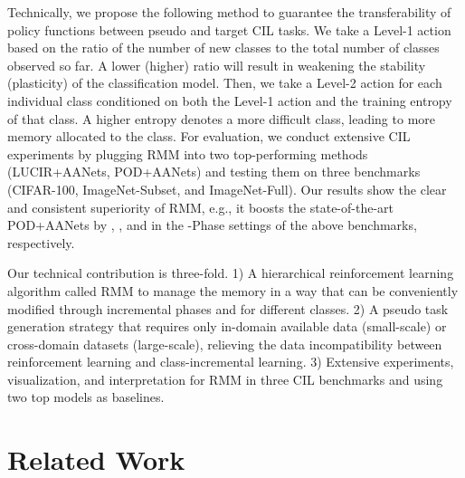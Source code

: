 \documentclass{article}
\begin{document}
Technically, we propose the following method to guarantee the transferability of policy functions between pseudo and target CIL tasks. We take a Level-1 action based on the ratio of the number of new classes to the total number of classes observed so far. A lower (higher) ratio will result in weakening the stability (plasticity) of the classification model. Then, we take a Level-2 action for each individual class conditioned on both the Level-1 action and the training entropy of that class. A higher entropy denotes a more difficult class, leading to more memory allocated to the class. For evaluation, we conduct extensive CIL experiments by plugging RMM into two top-performing methods (LUCIR+AANets, POD+AANets) and testing them on three benchmarks (CIFAR-100, ImageNet-Subset, and ImageNet-Full). Our results show the clear and consistent superiority of RMM, e.g., it boosts the state-of-the-art POD+AANets by , , and  in the -Phase settings of the above benchmarks, respectively.

Our technical contribution is three-fold. 1) A hierarchical reinforcement learning algorithm called RMM to manage the memory in a way that can be conveniently modified through incremental phases and for different classes. 2) A pseudo task generation strategy that requires only in-domain available data (small-scale) or cross-domain datasets (large-scale), relieving the data incompatibility between reinforcement learning and class-incremental learning. 
3) Extensive experiments, visualization, and interpretation for RMM in three CIL benchmarks and using two top models as baselines. \section{Related Work}
\label{sec2}
\end{document}
